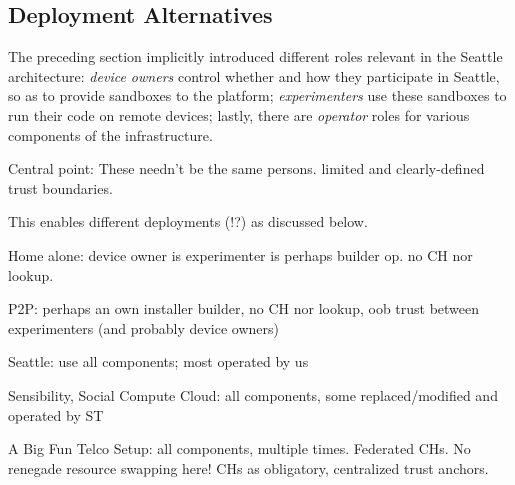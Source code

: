 \subsection{Deployment Alternatives}
The preceding section implicitly introduced different roles relevant
in the Seattle architecture:
\textit{device owners} control whether and how they participate
in Seattle, so as to provide sandboxes to the platform;
\textit{experimenters} use these sandboxes to run their code
on remote devices;
lastly, there are \textit{operator} roles for various components
of the infrastructure.

Central point: These needn't be the same persons.
limited and clearly-defined trust boundaries.

This enables different deployments (!?) as discussed below.


Home alone: device owner is experimenter is perhaps builder op.
no CH nor lookup.

P2P: perhaps an own installer builder, no CH nor lookup,
oob trust between experimenters (and probably device owners)

Seattle: use all components; most operated by us

Sensibility, Social Compute Cloud: all components, some replaced/modified
and operated by ST

A Big Fun Telco Setup: all components, multiple times. Federated CHs.
No renegade resource swapping here! CHs as obligatory, centralized trust
anchors.
